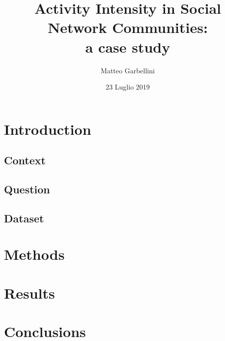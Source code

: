\documentclass{beamer}
\title[Activity Intensity in Social Network Communities]{Activity Intensity in Social Network Communities:  \\ a case study}
\author{Matteo Garbellini}
\institute[(UniMi)] 
{
Universit\`a degli Studi di Milano \\ 
\medskip
}
\date{23 Luglio 2019}
\begin{document}
{
\begin{frame}
\titlepage
\end{frame}
}



\section{Introduction}
\subsection{Context}
\subsection{Question}
\subsection{Dataset}
\section{Methods}
\section{Results}
\section{Conclusions}
\end{document}
